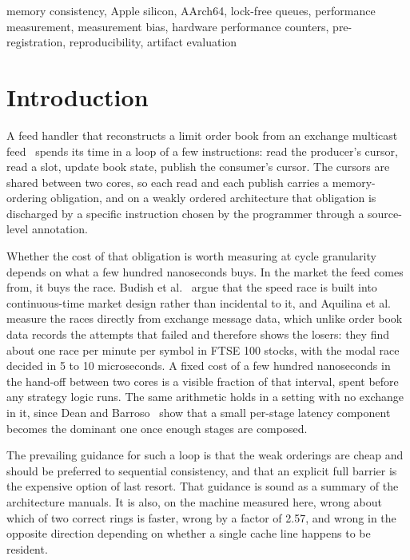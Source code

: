 \documentclass[conference]{IEEEtran}
\begin{document}
\begin{IEEEkeywords}
memory consistency, Apple silicon, AArch64, lock-free queues, performance
measurement, measurement bias, hardware performance counters,
pre-registration, reproducibility, artifact evaluation
\end{IEEEkeywords}

\section{Introduction}

A feed handler that reconstructs a limit order book from an exchange multicast
feed~\cite{maciejewski2026cme} spends its time in a loop of a few instructions: read the producer's
cursor, read a slot, update book state, publish the consumer's cursor. The
cursors are shared between two cores, so each read and each publish carries a
memory-ordering obligation, and on a weakly ordered architecture that
obligation is discharged by a specific instruction chosen by the programmer
through a source-level annotation.

Whether the cost of that obligation is worth measuring at cycle granularity
depends on what a few hundred nanoseconds buys. In the market the feed comes
from, it buys the race. Budish et al.~\cite{budish2015hft} argue that the speed
race is built into continuous-time market design rather than incidental to it,
and Aquilina et al.~\cite{aquilina2022quantifying} measure the races directly
from exchange message data, which unlike order book data records the attempts
that failed and therefore shows the losers: they find about one race per minute
per symbol in FTSE 100 stocks, with the modal race decided in 5 to 10
microseconds. A fixed cost of a few hundred nanoseconds in the hand-off between
two cores is a visible fraction of that interval, spent before any strategy
logic runs. The same arithmetic holds in a setting with no exchange in it, since
Dean and Barroso~\cite{dean2013tail} show that a small per-stage latency
component becomes the dominant one once enough stages are composed.

The prevailing guidance for such a loop is that the weak orderings are cheap
and should be preferred to sequential consistency, and that an explicit full
barrier is the expensive option of last resort. That guidance is sound as a
summary of the architecture manuals. It is also, on the machine measured here,
wrong about which of two correct rings is faster, wrong by a factor of 2.57,
and wrong in the opposite direction depending on whether a single cache line
happens to be resident.
\end{document}
